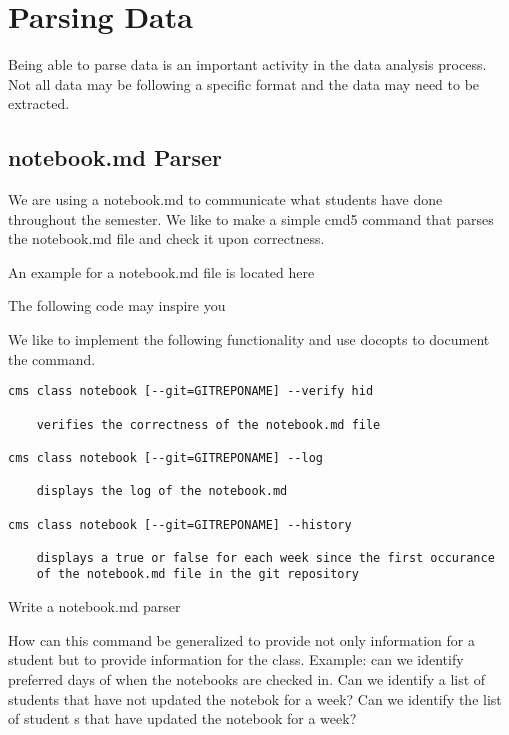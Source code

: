 \section{Parsing Data}

Being able to parse data is an important activity in the data analysis
process. Not all data may be following a specific format and the data
may need to be extracted.


\subsection{notebook.md Parser}

We are using a notebook.md to communicate what students have done
throughout the semester. We like to make a simple cmd5 command that
parses the notebook.md file and check it upon correctness.

An example for a notebook.md file is located here 


The following code may inspire you


We like to implement the following functionality and use docopts to
document the command.

\begin{lstlisting}
cms class notebook [--git=GITREPONAME] --verify hid

    verifies the correctness of the notebook.md file

cms class notebook [--git=GITREPONAME] --log

    displays the log of the notebook.md

cms class notebook [--git=GITREPONAME] --history

    displays a true or false for each week since the first occurance
    of the notebook.md file in the git repository
\end{lstlisting}

\begin{exercise}
  \label{E:notebook-md.1}
  Write a notebook.md parser
\end{exercise}

\begin{exercise}
  \label{E:notebook-md.2}
  How can this command be generalized to provide not only information
  for a student but to provide information for the class. Example: can
  we identify preferred days of when the notebooks are checked in. Can
  we identify a list of students that have not updated the notebok for
  a week?  Can we identify the list of student s that have updated the
  notebook for a week? 
\end{exercise}


